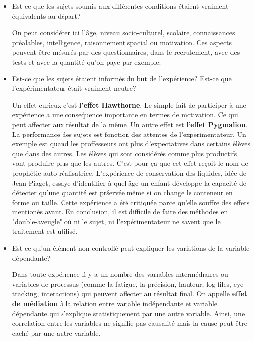 \begin{itemize}
\item Est-ce que les sujets soumis aux diff\'erentes conditions \'etaient vraiment \'equivalents au d\'epart?

On peut consid\'erer ici l'\^age, niveau socio-culturel, scolaire, connaissances pr\'ealables, intelligence, raisonnement spacial ou motivation. Ces aspects peuvent \^etre m\'esur\'es par des questionnaires, dans le recrutement, avec des tests et avec la quantit\'e qu'on paye par exemple.

\item Est-ce que les sujets \'etaient inform\'es du but de l'exp\'erience? Est-ce que l'exp\'erimentateur \'etait vraiment neutre?

Un effet curieux c'est \textbf{l'effet Hawthorne}. Le simple fait de participer \`a une exp\'erience a une conse\'quence importante en termes de motivation. Ce qui peut affecter aux r\'esultat de la m\^eme. Un autre effet est \textbf{l'effet Pygmalion}. La performance des sujets est fonction des attentes de l'experimentateur. Un exemple est quand les proffesseurs ont plus d'expectatives dans certains \'el\`eves que dans des autres. Les \'el\`eves qui sont consid\'er\'es comme plus productifs vont produire plus que les autres. C'est pour \c{c}a que cet effet re\c{c}oit le nom de proph\'etie auto-r\'ealisatrice. L'exp\'erience de conservation des liquides, id\'ee de Jean Piaget, essaye d'identifier \`a quel \^age un enfant d\'eveloppe la capacit\'e de d\'etecter qu'une quantit\'e est pr\'serv\'ee m\^eme si on change le conteneur en forme ou taille. Cette exp\'erience a \'et\'e critiqu\'ee parce qu'elle souffre des effets mention\'es avant. En conclusion, il est difficile de faire des m\'ethodes en "double-aveugle" o\`u ni le sujet, ni l'exp\'erimentateur ne savent que le traitement est utilis\'e.

\item Est-ce qu'un \'el\'ement non-controll\'e peut expliquer les variations de la variable d\'ependante?

Dans toute exp\'erience il y a un nombre des variables interm\'ediaires ou variables de processus (comme la fatigue, la pr\'ecision, hauteur, log files, eye tracking, interactions) qui peuvent affecter au r\'esultat final. On appelle \textbf{effet de m\'ediation} \`a la relation entre variable ind\'ependante et variable d\'ependante qui s'explique statistiquement par une autre variable. Ainsi, une correlation entre les variables ne signifie pas causalit\'e mais la cause peut \^etre cach\'e par une autre variable.


\end{itemize}
